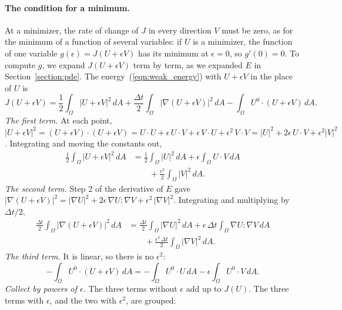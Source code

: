 \paragraph{The condition for a minimum.} At a minimizer, the rate of change of $J$ in every direction $V$ must be zero, as for the minimum of a function of several variables: if $U$ is a minimizer, the function of one variable $g(\epsilon) = J(U + \epsilon V)$ has its minimum at $\epsilon = 0$, so $g'(0) = 0$. To compute $g$, we expand $J(U + \epsilon V)$ term by term, as we expanded $E$ in Section~\ref{section:pde}. The energy~(\ref{eqn:weak_energy}) with $U + \epsilon V$ in the place of $U$ is
\begin{equation*}
J(U + \epsilon V) = \frac12 \int_\Omega |U + \epsilon V|^2\, dA + \frac{\Delta t}{2} \int_\Omega |\nabla (U + \epsilon V)|^2\, dA - \int_\Omega U^0 \cdot (U + \epsilon V)\, dA .
\end{equation*}
\emph{The first term.} At each point, $|U + \epsilon V|^2 = (U + \epsilon V)\cdot(U + \epsilon V) = U\cdot U + \epsilon\, U\cdot V + \epsilon\, V\cdot U + \epsilon^2\, V\cdot V = |U|^2 + 2\epsilon\, U\cdot V + \epsilon^2 |V|^2$. Integrating and moving the constants out,
\begin{align*}
\frac12 \int_\Omega |U + \epsilon V|^2\, dA &= \frac12 \int_\Omega |U|^2\, dA + \epsilon \int_\Omega U\cdot V\, dA \\
&\qquad + \frac{\epsilon^2}{2}\int_\Omega |V|^2\, dA .
\end{align*}
\emph{The second term.} Step 2 of the derivative of $E$ gave $|\nabla(U + \epsilon V)|^2 = |\nabla U|^2 + 2\epsilon\, \nabla U : \nabla V + \epsilon^2\, |\nabla V|^2$. Integrating and multiplying by $\Delta t/2$,
\begin{align*}
\frac{\Delta t}{2} \int_\Omega |\nabla (U + \epsilon V)|^2\, dA &= \frac{\Delta t}{2} \int_\Omega |\nabla U|^2\, dA + \epsilon\, \Delta t \int_\Omega \nabla U : \nabla V\, dA \\
&\qquad + \frac{\epsilon^2\,\Delta t}{2}\int_\Omega |\nabla V|^2\, dA .
\end{align*}
\emph{The third term.} It is linear, so there is no $\epsilon^2$:
\begin{equation*}
-\int_\Omega U^0 \cdot (U + \epsilon V)\, dA = -\int_\Omega U^0 \cdot U\, dA - \epsilon \int_\Omega U^0 \cdot V\, dA .
\end{equation*}
\emph{Collect by powers of $\epsilon$.} The three terms without $\epsilon$ add up to $J(U)$. The three terms with $\epsilon$, and the two with $\epsilon^2$, are grouped:
